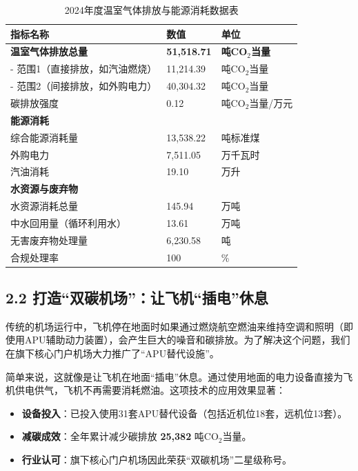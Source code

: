 \documentclass[a4paper,12pt]{article}
\begin{document}
\begin{table}[h]
    \centering
    \caption{2024年度温室气体排放与能源消耗数据表}
    \label{tab:env_data}
    \renewcommand{\arraystretch}{1.3}
    \begin{tabular}{p{6cm} p{4cm} p{4cm}}
        \toprule
        \textbf{指标名称} & \textbf{数值} & \textbf{单位} \\
        \midrule
        \textbf{温室气体排放总量} & \textbf{51,518.71} & \textbf{吨CO$_2$当量} \\
        \quad - 范围1（直接排放，如汽油燃烧） & 11,214.39 & 吨CO$_2$当量 \\
        \quad - 范围2（间接排放，如外购电力） & 40,304.32 & 吨CO$_2$当量 \\
        碳排放强度 & 0.12 & 吨CO$_2$当量/万元 \\
        \midrule
        \textbf{能源消耗} & & \\
        综合能源消耗量 & 13,538.22 & 吨标准煤 \\
        外购电力 & 7,511.05 & 万千瓦时 \\
        汽油消耗 & 19.10 & 万升 \\
        \midrule
        \textbf{水资源与废弃物} & & \\
        水资源消耗总量 & 145.94 & 万吨 \\
        中水回用量（循环利用水） & 13.61 & 万吨 \\
        无害废弃物处理量 & 6,230.58 & 吨 \\
        合规处理率 & 100 & \% \\
        \bottomrule
    \end{tabular}
\end{table}

\subsection{2.2 打造“双碳机场”：让飞机“插电”休息}

传统的机场运行中，飞机停在地面时如果通过燃烧航空燃油来维持空调和照明（即使用APU辅助动力装置），会产生巨大的噪音和碳排放。为了解决这个问题，我们在旗下核心门户机场大力推广了“APU替代设施”。

简单来说，这就像是让飞机在地面“插电”休息。通过使用地面的电力设备直接为飞机供电供气，飞机不再需要消耗燃油。这项技术的应用效果显著：

\begin{itemize}
    \item \textbf{设备投入}：已投入使用31套APU替代设备（包括近机位18套，远机位13套）。
    \item \textbf{减碳成效}：全年累计减少碳排放 \textbf{25,382} 吨CO$_2$当量。
    \item \textbf{行业认可}：旗下核心门户机场因此荣获“双碳机场”二星级称号。
\end{itemize}
\end{document}

